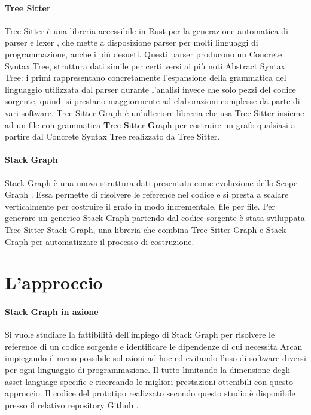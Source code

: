 \paragraph{Tree Sitter}

Tree Sitter \cite{TreeSitter} \`e una libreria accessibile in Rust per la generazione automatica di parser e lexer \cite{sestoft2017programming}, che mette a disposizione parser per molti linguaggi di programmazione, anche i pi\`u desueti. Questi parser producono un Concrete Syntax Tree, struttura dati simile per certi versi ai pi\`u noti Abstract Syntax Tree: i primi rappresentano concretamente l'espansione della grammatica del linguaggio utilizzata dal parser durante l'analisi invece che solo pezzi del codice sorgente, quindi si prestano maggiormente ad elaborazioni complesse da parte di vari software. Tree Sitter Graph \`e un'ulteriore libreria che usa Tree Sitter insieme ad un file con grammatica \textbf{T}ree \textbf{S}itter \textbf{G}raph per costruire un grafo qualsiasi a partire dal Concrete Syntax Tree realizzato da Tree Sitter.

\paragraph{Stack Graph}

Stack Graph \cite{StackGraph} \`e una nuova struttura dati presentata \cite{StackGraphNameResolutionAtScale} come evoluzione dello Scope Graph \cite{ScopeGraph}. Essa permette di risolvere le reference nel codice e si presta a scalare verticalmente per costruire il grafo in modo incrementale, file per file. Per generare un generico Stack Graph partendo dal codice sorgente \`e stata sviluppata Tree Sitter Stack Graph, una libreria che combina Tree Sitter Graph e Stack Graph per automatizzare il processo di costruzione.

\section{L'approccio}

\paragraph{Stack Graph in azione}

Si vuole studiare la fattibilit\`a dell'impiego di Stack Graph per risolvere le reference di un codice sorgente e identificare le dipendenze di cui necessita Arcan impiegando il meno possibile soluzioni ad hoc ed evitando l'uso di software diversi per ogni linguaggio di programmazione. Il tutto limitando la dimensione degli asset language specific e ricercando le migliori prestazioni ottenibili con questo approccio. Il codice del prototipo realizzato secondo questo studio \`e disponibile presso il relativo repository Github \cite{SkullianRepository}.

